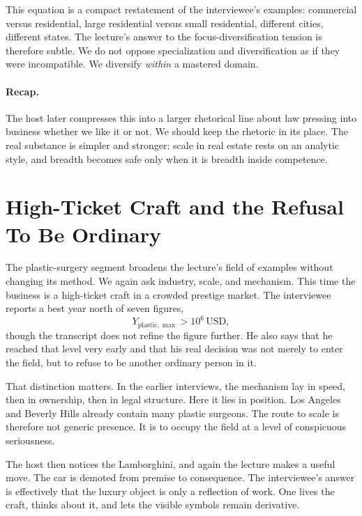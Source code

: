 This equation is a compact restatement of the interviewee's examples: commercial versus residential, large residential versus small residential, different cities, different states. The lecture's answer to the focus-diversification tension is therefore subtle. We do not oppose specialization and diversification as if they were incompatible. We diversify \emph{within} a mastered domain.

\paragraph{Recap.} The host later compresses this into a larger rhetorical line about law pressing into business whether we like it or not. We should keep the rhetoric in its place. The real substance is simpler and stronger: scale in real estate rests on an analytic style, and breadth becomes safe only when it is breadth inside competence.

\section{High-Ticket Craft and the Refusal To Be Ordinary}

The plastic-surgery segment broadens the lecture's field of examples without changing its method. We again ask industry, scale, and mechanism. This time the business is a high-ticket craft in a crowded prestige market. The interviewee reports a best year north of seven figures,
\begin{equation}
Y_{\mathrm{plastic},\max} > 10^6 \,\mathrm{USD},
\end{equation}
though the transcript does not refine the figure further. He also says that he reached that level very early and that his real decision was not merely to enter the field, but to refuse to be another ordinary person in it.

That distinction matters. In the earlier interviews, the mechanism lay in speed, then in ownership, then in legal structure. Here it lies in position. Los Angeles and Beverly Hills already contain many plastic surgeons. The route to scale is therefore not generic presence. It is to occupy the field at a level of conspicuous seriousness.

The host then notices the Lamborghini, and again the lecture makes a useful move. The car is demoted from premise to consequence. The interviewee's answer is effectively that the luxury object is only a reflection of work. One lives the craft, thinks about it, and lets the visible symbols remain derivative.

